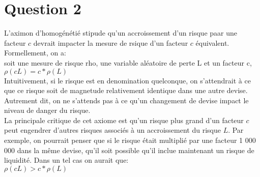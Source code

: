 \section{Question 2}

L'aximon d'homogénétié stipude qu'un accroissement d'un risque paar une facteur $c$ devrait impacter la mesure de rsique d'un facteur $c$ équivalent. Formellement, on a:\\
soit une mesure de risque rho, une variable aléatoire de perte L et un facteur c,\\
$\rho(cL) = c*\rho(L)$\\

Intuitivement, si le risque est en denomination quelconque, on s'attendrait à ce que ce risque soit de magnetude relativement identique dans une autre devise. Autrement dit, on ne s'attends pas à ce qu'un changement de devise impact le niveau de danger du risque. \\

La principale critique de cet axiome est qu'un risque plus grand d'un facteur $c$ peut engendrer d'autres risques associés à un accroissement du risque $L$. Par exemple, on pourrait penser que si le risque était multiplié par une facteur 1 000 000 dans la même devise, qu'il soit possible qu'il inclue maintenant un risque de liquidité. Dans un tel cas on aurait que: \\
$\rho(cL) > c*\rho(L)$\\
